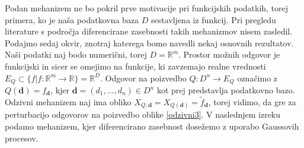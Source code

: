 \documentclass[12pt,a4paper]{amsart}
\theoremstyle{definition} %
\theoremstyle{plain} %
\begin{document}
\newline
Podan mehanizem ne bo pokril prve motivacije pri funkcijskih podatkih, torej primera, ko je naša podatkovna baza $D$ sestavljena iz funkcij. Pri pregledu literature s področja diferencirane zasebnosti takih mehanizmov nisem zasledil.
\newline
\newline
Podajmo sedaj okvir, znotraj katerega bomo navedli nekaj osnovnih rezultatov. Naši podatki naj bodo numerični, torej $D=\mathbb{R}^m$. Prostor možnih odgovor je funkcijski in sicer se omejimo na funkcije, ki zavzemajo realne vrednosti $E_Q \subset \{f | f : \mathbb{R}^m \rightarrow \mathbb{R}\} = \mathbb{R}^D$. Odgovor na poizvedbo $Q: D^n \rightarrow E_Q$ označimo z $Q(\textbf{d})=f_{\textbf{d}}$, kjer $\textbf{d} = (d_1,...,d_n) \in D^n$ kot prej predstavlja podatkovno bazo. Odzivni mehanizem naj ima obliko $X_{Q,\textbf{d}} = X_{Q(\textbf{d})} = \widetilde{f}_{\textbf{d}} $, torej vidimo, da gre za perturbacijo odgovorov na poizvedbo oblike \eqref{odzivni3}. V naslednjem izreku podamo mehanizem, kjer diferencirano zasebnost dosežemo z uporabo Gaussovih procesov.
\end{document}
